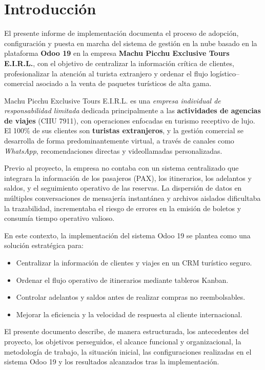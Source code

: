 \section{Introducción}

El presente informe de implementación documenta el proceso de adopción, configuración y puesta en marcha del sistema de gestión en la nube basado en la plataforma \textbf{Odoo 19} en la empresa \textbf{Machu Picchu Exclusive Tours E.I.R.L.}, con el objetivo de centralizar la información crítica de clientes, profesionalizar la atención al turista extranjero y ordenar el flujo logístico--comercial asociado a la venta de paquetes turísticos de alta gama.

Machu Picchu Exclusive Tours E.I.R.L. es una \textit{empresa individual de responsabilidad limitada} dedicada principalmente a las \textbf{actividades de agencias de viajes} (CIIU 7911), con operaciones enfocadas en turismo receptivo de lujo. El 100\% de sus clientes son \textbf{turistas extranjeros}, y la gestión comercial se desarrolla de forma predominantemente virtual, a través de canales como \textit{WhatsApp}, recomendaciones directas y videollamadas personalizadas.

Previo al proyecto, la empresa no contaba con un sistema centralizado que integrara la información de los pasajeros (PAX), los itinerarios, los adelantos y saldos, y el seguimiento operativo de las reservas. La dispersión de datos en múltiples conversaciones de mensajería instantánea y archivos aislados dificultaba la trazabilidad, incrementaba el riesgo de errores en la emisión de boletos y consumía tiempo operativo valioso.

En este contexto, la implementación del sistema Odoo 19 se plantea como una solución estratégica para:

\begin{itemize}
    \item Centralizar la información de clientes y viajes en un CRM turístico seguro.
    \item Ordenar el flujo operativo de itinerarios mediante tableros Kanban.
    \item Controlar adelantos y saldos antes de realizar compras no reembolsables.
    \item Mejorar la eficiencia y la velocidad de respuesta al cliente internacional.
\end{itemize}

El presente documento describe, de manera estructurada, los antecedentes del proyecto, los objetivos perseguidos, el alcance funcional y organizacional, la metodología de trabajo, la situación inicial, las configuraciones realizadas en el sistema Odoo 19 y los resultados alcanzados tras la implementación.

